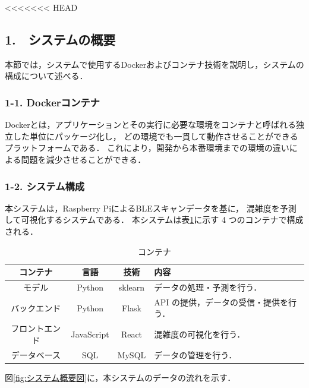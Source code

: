 <<<<<<< HEAD
\subsection*{1.　システムの概要}


本節では，システムで使用するDockerおよびコンテナ技術を説明し，システムの構成について述べる．


\subsubsection*{1-1. Dockerコンテナ}

Dockerとは，アプリケーションとその実行に必要な環境をコンテナと呼ばれる独立した単位にパッケージ化し，
どの環境でも一貫して動作させることができるプラットフォームである．
これにより，開発から本番環境までの環境の違いによる問題を減少させることができる．

\subsubsection*{1-2. システム構成}

本システムは，Raspberry PiによるBLEスキャンデータを基に，
混雑度を予測して可視化するシステムである．
本システムは表\ref{tbl:コンテナ}に示す 4 つのコンテナで構成される．

\begin{table}[tb]
	\centering
	\caption{コンテナ}
	\label{tbl:コンテナ}
	\small
	\doublerulesep=0.3pt
	\begin{tabular}{cccl} \hline\hline\hline
		コンテナ & 言語 & 技術 & 内容 \\ \hline
		モデル & Python & sklearn &  データの処理・予測を行う． \\
		バックエンド & Python & Flask & API の提供，データの受信・提供を行う． \\
		フロントエンド & JavaScript & React & 混雑度の可視化を行う． \\
		データベース & SQL & MySQL & データの管理を行う． \\  \hline
	\end{tabular}
\end{table}

図\ref{fig:システム概要図}に，本システムのデータの流れを示す．

